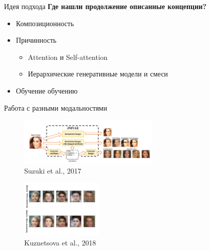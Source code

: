 \documentclass[usenames,dvipsnames,10pt,pdf,utf8,russian,aspectratio=43]{beamer}
\begin{document}
\begin{frame}{Идея подхода}
\textbf{Где нашли продолжение описанные концепции?}
\begin{itemize}
\item Композиционность

\item Причинность
\begin{itemize}
\item Attention и Self-attention
\item Иерархические генеративные модели и смеси
\end{itemize}
\item Обучение обучению
\end{itemize}
\end{frame}


\begin{frame}{Работа с разными модальностями}
\centering

\centering
\begin{figure}
\includegraphics[width=0.6\textwidth]{jmvae.png}
\caption{Suzuki et al., 2017 }
\end{figure}

\begin{figure}
\includegraphics[width=0.35\textwidth]{vbta.png}
\caption{Kuznetsova et al., 2018}
\end{figure}


\end{frame}
\end{document}

